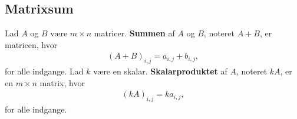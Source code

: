 \subsection{Matrixsum}
%
\begin{defn}{}{}
Lad $A$ og $B$ være $m \times n$ matricer.
\textbf{Summen} af $A$ og $B$, noteret $A + B$, er matricen, hvor
\begin{align*}
(A + B)_{i,j} = a_{i,j} + b_{i,j},
\end{align*}
for alle indgange.
Lad $k$ være en skalar.
\textbf{Skalarproduktet} af $A$, noteret $kA$, er en $m \times n$ matrix, hvor
\begin{align*}
(kA)_{i,j} = ka_{i,j},
\end{align*}
for alle indgange.

\end{defn}
%
